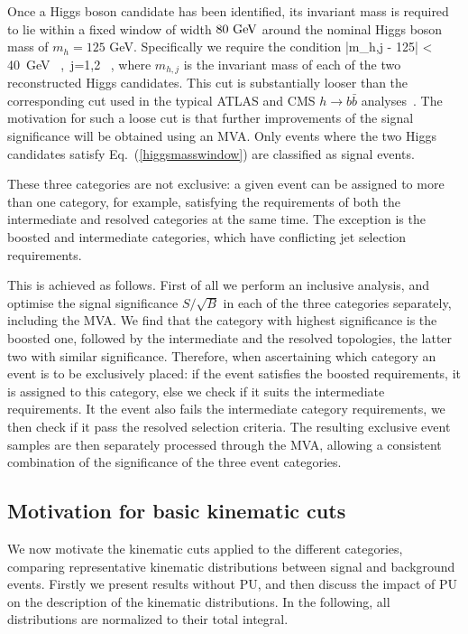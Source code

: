 Once a Higgs boson candidate has been identified,
its invariant mass is required to lie within a fixed window
of width $80~{\rm GeV}$ around the nominal Higgs boson mass of $m_h= 125$
GeV.
%
Specifically we require the condition
\be
\label{higgsmasswindow}
|m_{h,j} - 125| < 40~{\rm GeV} \, ,\, j=1,2 \, ,
\ee
where $m_{h,j}$ is the invariant mass of each of the two reconstructed  Higgs candidates.
%
This cut is substantially looser than the corresponding
cut used in the typical ATLAS and CMS $h\to b\bar{b}$
analyses~\cite{Aad:2012gxa,Chatrchyan:2013zna}.
%
The motivation
for such a loose cut 
is that further improvements of the
signal significance will be obtained using an MVA.
%
Only events where the two Higgs candidates satisfy
Eq.~(\ref{higgsmasswindow}) are classified as signal events.
%

These three categories are not exclusive:
a given event can be assigned to more than one category, for
example, satisfying the requirements of both the intermediate
and resolved
categories at the same time.
%
The exception is the boosted and intermediate categories, which have
conflicting jet selection requirements.
%

This is achieved as follows.
First of all we perform an inclusive analysis, and optimise the
signal significance
$S/\sqrt{B}$ in each of the three categories separately, including
the MVA.
%
We find that the category with highest significance is
the boosted one,
followed by the intermediate and the resolved topologies, the latter two
with similar significance.
%
Therefore, when ascertaining which category an event is to be exclusively placed:
if the event satisfies the boosted requirements, it is assigned to
this category, else we check if it suits the intermediate
requirements.
%
It the event also fails the intermediate category
requirements, we
then check if it pass the resolved selection criteria.
%
The resulting exclusive event samples are then separately processed
through the MVA, allowing a consistent combination
of the significance of the three event categories.

\subsection{Motivation for basic kinematic cuts}

We now motivate the
kinematic cuts applied to the different categories, 
comparing representative kinematic distributions between
signal and background events.
%
Firstly we present results without PU, and then
discuss
the impact of PU
on the description of the kinematic
distributions.
%
In the following, all
distributions are normalized to their total integral.


